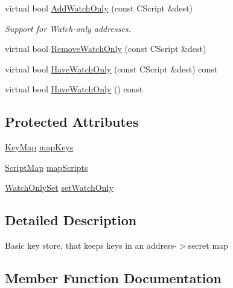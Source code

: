 \begin{DoxyCompactItemize}
virtual bool \hyperlink{class_c_basic_key_store_a2417d0ae4e654c88cf47a1ba5f71b5a3}{Add\+Watch\+Only} (const C\+Script \&dest)
\begin{DoxyCompactList}\small\item\em Support for Watch-\/only addresses. \end{DoxyCompactList}\item 
virtual bool \hyperlink{class_c_basic_key_store_a20c0eccf943d6d16e24c6e2fb63fb527}{Remove\+Watch\+Only} (const C\+Script \&dest)
\item 
virtual bool \hyperlink{class_c_basic_key_store_a51d4c7e95cb782d749939d01612926f7}{Have\+Watch\+Only} (const C\+Script \&dest) const 
\item 
virtual bool \hyperlink{class_c_basic_key_store_a3d89af8d9e9e0bb4eb90f331a638ff6d}{Have\+Watch\+Only} () const 
\end{DoxyCompactItemize}
\subsection*{Protected Attributes}
\begin{DoxyCompactItemize}
\item 
\hyperlink{keystore_8h_a4dc9f57afc8615aef701e40cf20d024f}{Key\+Map} \hyperlink{class_c_basic_key_store_ac520003e5c3d863bf71fde247c6e0672}{map\+Keys}
\item 
\hyperlink{keystore_8h_afb22a3e7e10e8048d2fb3fb72fe38345}{Script\+Map} \hyperlink{class_c_basic_key_store_a8e9fa81382129c1535a0ee7b0d9c8f3b}{map\+Scripts}
\item 
\hyperlink{keystore_8h_a501c3a7b9932bbc7168dc7b3fc5d149e}{Watch\+Only\+Set} \hyperlink{class_c_basic_key_store_ac3391cb491e315403ad9af6afd1313da}{set\+Watch\+Only}
\end{DoxyCompactItemize}


\subsection{Detailed Description}
Basic key store, that keeps keys in an address-\/$>$secret map 

\subsection{Member Function Documentation}
\hypertarget{class_c_basic_key_store_a56249ce3540398999cd397eeb662e836}{}
